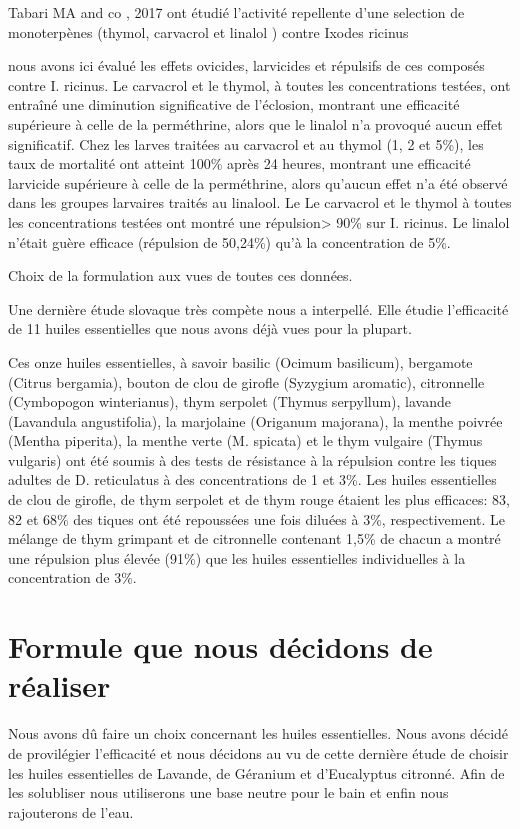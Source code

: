 \documentclass[12pt,a4wide]{article}
\begin{document}
Tabari MA and co , 2017 ont étudié l'activité repellente d'une selection de monoterpènes (thymol, carvacrol et linalol ) contre Ixodes ricinus

nous avons ici évalué les effets ovicides, larvicides et répulsifs de ces composés contre I. ricinus. 
Le carvacrol et le thymol, à toutes les concentrations testées, ont entraîné une diminution significative de l'éclosion, montrant une efficacité supérieure à celle de la perméthrine, alors que le linalol n'a provoqué aucun effet significatif. Chez les larves traitées au carvacrol et au thymol (1, 2 et 5\%), les taux de mortalité ont atteint 100\% après 24 heures, montrant une efficacité larvicide supérieure à celle de la perméthrine, alors qu'aucun effet n'a été observé dans les groupes larvaires traités au linalool. Le 
Le carvacrol et le thymol à toutes les concentrations testées ont montré une répulsion> 90\% sur I. ricinus. Le linalol n'était guère efficace (répulsion de 50,24\%) qu'à la concentration de 5\%. 




Choix de la formulation aux vues de toutes ces données.

Une dernière étude slovaque très compète nous a interpellé. Elle étudie l'efficacité de 11 huiles essentielles que nous avons déjà vues pour la plupart.


Ces onze huiles essentielles, à savoir basilic (Ocimum basilicum), bergamote (Citrus bergamia), bouton de clou de girofle (Syzygium aromatic), citronnelle (Cymbopogon winterianus), thym serpolet (Thymus serpyllum), lavande (Lavandula angustifolia), la marjolaine (Origanum majorana), la menthe poivrée (Mentha piperita), la menthe verte (M. spicata) et le thym vulgaire (Thymus vulgaris) ont été soumis à des tests de résistance à la répulsion contre les tiques adultes de D. reticulatus à des concentrations de 1 et 3\%. Les huiles essentielles de clou de girofle, de thym serpolet et de thym rouge étaient les plus efficaces: 83, 82 et 68\% des tiques ont été repoussées une fois diluées à 3\%, respectivement. Le mélange de thym grimpant et de citronnelle contenant 1,5\% de chacun a montré une répulsion plus élevée (91\%) que les huiles essentielles individuelles à la concentration de 3\%.


\section{Formule que nous décidons de réaliser}
\label{sec-5}

Nous avons  dû faire  un choix  concernant les  huiles essentielles.  Nous avons
décidé de  provilégier l'efficacité  et nous  décidons au  vu de  cette dernière
étude de choisir les huiles essentielles de Lavande, de Géranium et d'Eucalyptus
citronné. Afin de  les solubliser nous utiliserons une base  neutre pour le bain
et enfin nous rajouterons de l'eau.
\end{document}
